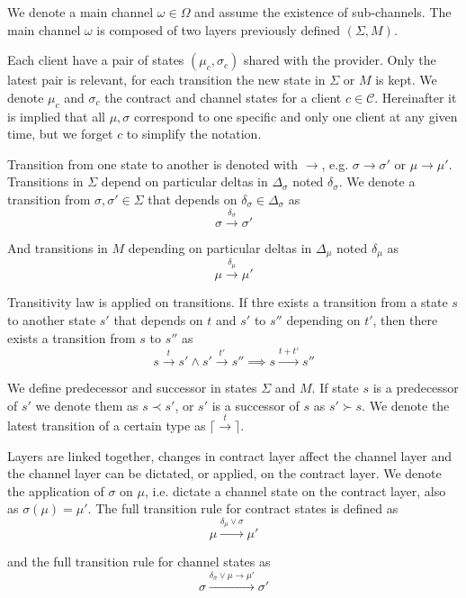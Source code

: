 \documentclass{llncs}
\begin{document}
We denote a main channel $\omega \in \Omega$ and assume the existence of sub-channels. The main channel $\omega$ is composed of two layers previously defined $(\Sigma, M)$.

Each client have a pair of states $(\mu_c, \sigma_c)$ shared with the provider. Only the latest pair is relevant, for each transition the new state in $\Sigma$ or $M$ is kept. We denote $\mu_c$ and $\sigma_c$ the contract and channel states for a client $c \in \mathcal{C}$. Hereinafter it is implied that all $\mu, \sigma$ correspond to one specific and only one client at any given time, but we forget $c$ to simplify the notation.

Transition from one state to another is denoted with $\rightarrow$, e.g. $\sigma \rightarrow \sigma'$ or $\mu \rightarrow \mu'$. Transitions in $\Sigma$ depend on particular deltas in $\Delta_\sigma$ noted $\delta_\sigma$. We denote a transition from $\sigma, \sigma' \in \Sigma$ that depends on $\delta_\sigma \in \Delta_\sigma$ as
$$\sigma \xrightarrow{\delta_\sigma} \sigma'$$

And transitions in $M$ depending on particular deltas in $\Delta_\mu$ noted $\delta_\mu$ as
$$\mu \xrightarrow{\delta_\mu} \mu'$$

Transitivity law is applied on transitions. If thre exists a transition from a state $s$ to another state $s'$ that depends on $t$ and $s'$ to $s''$ depending on $t'$, then there exists a transition from $s$ to $s''$ as
$$s \xrightarrow{t} s' \land s' \xrightarrow{t'} s'' \implies s \xrightarrow{t + t'} s''$$

We define predecessor and successor in states $\Sigma$ and $M$. If state $s$ is a predecessor of $s'$ we denote them as $s \prec s'$, or $s'$ is a successor of $s$ as $s' \succ s$. We denote the latest transition of a certain type as $\lceil \xrightarrow{t} \rceil$.

Layers are linked together, changes in contract layer affect the channel layer and the channel layer can be dictated, or applied, on the contract layer. We denote the application of $\sigma$ on $\mu$, i.e. dictate a channel state on the contract layer, also as $\sigma(\mu) = \mu'$. The full transition rule for contract states is defined as
$$\mu \xrightarrow{\delta_\mu \lor \sigma} \mu'$$

and the full transition rule for channel states as
$$\sigma \xrightarrow{\delta_\sigma \lor \mu \rightarrow \mu'} \sigma'$$
\end{document}
